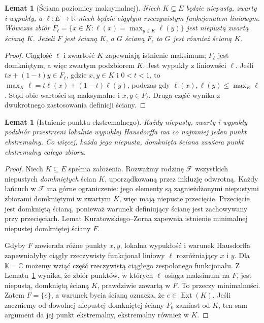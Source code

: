 \documentclass[11pt,a4paper]{article}
\numberwithin{equation}{section}
\theoremstyle{plain}
\newtheorem{lemat}[twierdzenie]{Lemat}
\theoremstyle{definition}
\theoremstyle{remark}
\newcommand{\R}{\mathbb R}
\newcommand{\C}{\mathbb C}
\newcommand{\K}{\mathbb K}
\begin{document}
\begin{lemat}[Ściana poziomicy maksymalnej]
\label{lem:max-face9}
Niech $K\subseteq E$ będzie niepusty, zwarty i wypukły,
a $\ell:E\to\R$ niech będzie ciągłym rzeczywistym
funkcjonałem liniowym. Wówczas zbiór
$F_\ell=\{x\in K:\ell(x)=\max_{y\in K}\ell(y)\}$
jest niepustą zwartą ścianą $K$.
Jeżeli $F$ jest ścianą $K$, a $G$ ścianą $F$,
to $G$ jest również ścianą $K$.
\end{lemat}
\begin{proof}
Ciągłość $\ell$ i zwartość $K$ zapewniają istnienie maksimum;
$F_\ell$ jest domkniętym, a więc zwartym podzbiorem $K$.
Jest wypukły z liniowości $\ell$. Jeśli
$tx+(1-t)y\in F_\ell$, gdzie $x,y\in K$ i $0<t<1$, to
$\max_K\ell=t\ell(x)+(1-t)\ell(y)$, podczas gdy
$\ell(x),\ell(y)\le\max_K\ell$. Stąd obie wartości
są maksymalne i $x,y\in F_\ell$. Druga część wynika
z dwukrotnego zastosowania definicji ściany.
\end{proof}

\begin{lemat}[Istnienie punktu ekstremalnego]
\label{lem:exist-extreme9}
Każdy niepusty, zwarty i wypukły podzbiór przestrzeni lokalnie
wypukłej Hausdorffa ma co najmniej jeden punkt ekstremalny.
Co więcej, każda jego niepusta, domknięta ściana zawiera
punkt ekstremalny całego zbioru.
\end{lemat}
\begin{proof}
Niech $K\subseteq E$ spełnia założenia. Rozważmy rodzinę
$\mathcal F$ wszystkich niepustych \emph{domkniętych} ścian $K$,
uporządkowaną przez inkluzję odwrotną.
Każdy łańcuch w $\mathcal F$ ma górne ograniczenie:
jego elementy są zagnieżdżonymi niepustymi zbiorami
domkniętymi w zwartym $K$, więc mają niepuste przecięcie.
Przecięcie jest domkniętą ścianą, ponieważ warunek definiujący
ścianę jest zachowywany przy przecięciach.
Lemat Kuratowskiego--Zorna zapewnia istnienie minimalnej
niepustej domkniętej ściany $F$.

Gdyby $F$ zawierała różne punkty $x,y$, lokalna wypukłość
i warunek Hausdorffa zapewniałyby ciągły rzeczywisty
funkcjonał liniowy $\ell$ rozróżniający $x$ i $y$.
Dla $\K=\C$ możemy wziąć część rzeczywistą ciągłego
zespolonego funkcjonału. Z Lematu~\ref{lem:max-face9}
wynika, że zbiór punktów, w których $\ell$ osiąga
maksimum na $F$, jest niepustą, domkniętą ścianą $K$,
prawdziwie zawartą w $F$. To przeczy minimalności.
Zatem $F=\{e\}$, a warunek bycia ścianą oznacza,
że $e\in\operatorname{Ext}(K)$.
Jeśli zaczniemy od dowolnej niepustej domkniętej ściany
$F_0$ zamiast od $K$, ten sam argument da jej punkt
ekstremalny, ekstremalny również w $K$.
\end{proof}
\end{document}
